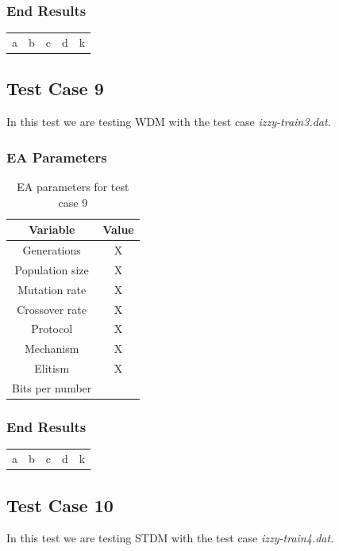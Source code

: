 \subsubsection{End Results}\label{sec:test-case-8-results}
\begin{table}
	\begin{tabular}{c c c c c}
		a & b & c & d & k \\
	\end{tabular}
\end{table}

\subsection{Test Case 9}\label{sec:test-case-9}
In this test we are testing WDM with the test case
\textit{izzy-train3.dat}.
\subsubsection{EA Parameters}\label{sec:test-case-9-parameters}
\begin{table}
	\begin{tabular}{c c}
		Variable & Value \\
		\hline
		Generations & X \\
		\hline
		Population size & X \\
		\hline
		Mutation rate & X \\
		\hline
		Crossover rate & X \\
		\hline
		Protocol & X \\
		\hline
		Mechanism & X \\
		\hline
		Elitism & X \\
		\hline
		Bits per number & \\
	\end{tabular}
	\caption{EA parameters for test case 9}
\end{table}
\subsubsection{End Results}\label{sec:test-case-9-results}
\begin{table}
	\begin{tabular}{c c c c c}
		a & b & c & d & k \\
	\end{tabular}
\end{table}

\subsection{Test Case 10}\label{sec:test-case-10}
In this test we are testing STDM with the test case
\textit{izzy-train4.dat}.
